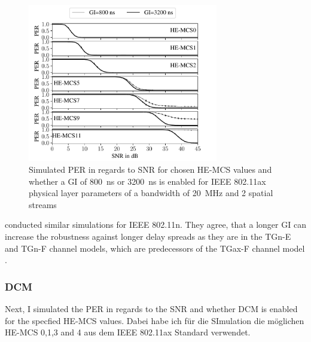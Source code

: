 \begin{figure}[H]%
	\centering
	\includegraphics[width=0.74\textwidth]{figures/GI_PER_to_SNR.pdf}
	\caption{Simulated \ac{PER} in regards to \ac{SNR} for chosen HE-\ac{MCS} values and whether a \ac{GI} of \SI{800}{\nano\second} or \SI{3200}{\nano\second} is enabled for IEEE 802.11ax physical layer parameters of a bandwidth of \SI{20}{\mega\hertz} and 2 spatial streams}%
	\label{fig:PER_SNR_GI}%
\end{figure}
\textcite{patil_ieee_2020} conducted similar simulations for IEEE 802.11n.
They agree, that a longer \ac{GI} can increase the robustness against longer delay spreads as they are in the TGn-E and TGn-F channel models,
which are predecessors of the TGax-F channel model \cite{TGAXCHANNEL}.

\subsubsection*{\acf{DCM}}
Next, I simulated the \ac{PER} in regards to the \ac{SNR}  and whether \ac{DCM} is enabled for the specfied HE-\ac{MCS} values. Dabei habe ich für die SImulation die möglichen
HE-MCS \num{0},\num{1},\num{3} and \num{4} aus dem IEEE 802.11ax Standard verwendet.

